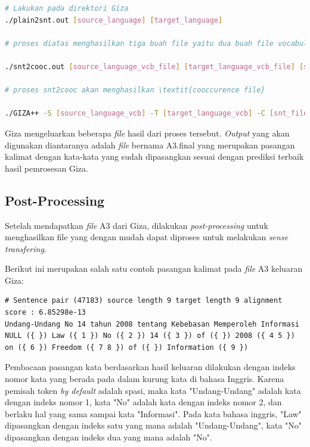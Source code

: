 \begin{lstlisting}[language=bash,caption={Word Alignment}, label={word-alignment}]
# Lakukan pada direktori Giza
./plain2snt.out [source_language] [target_language]

# proses diatas menghasilkan tiga buah file yaitu dua buah file vocabulary yang berisi indeks dengan kata (bahasa asal, dan bahasa tujuan), dan satu buah file snt yang berisi \textit{alignment} dari kalimat.

./snt2cooc.out [source_language_vcb_file] [target_language_vcb_file] [snt_file] > [coocurrence_file]

# proses snt2cooc akan menghasilkan \textit{cooccurence file}

./GIZA++ -S [source_language_vcb] -T [target_language_vcb] -C [snt_file] -CoocurrenceFile [cooc_file]
\end{lstlisting}

Giza mengeluarkan beberapa \textit{file} hasil dari proses tersebut. \textit{Output} yang akan digunakan diantaranya adalah \textit{file} bernama A3.final yang merupakan pasangan kalimat dengan kata-kata yang sudah dipasangkan sesuai dengan prediksi terbaik hasil pemrosesan Giza.

\subsection{Post-Processing}
Setelah mendapatkan \textit{file} A3 dari Giza, dilakukan \textit{post-processing} untuk menghasilkan file yang dengan mudah dapat diproses untuk melakukan \textit{sense transfering}.

Berikut ini merupakan salah satu contoh pasangan kalimat pada \textit{file} A3 keluaran Giza:

\begin{lstlisting}[caption={A3-File}, label={a3-file}]
# Sentence pair (47183) source length 9 target length 9 alignment score : 6.85298e-13
Undang-Undang No 14 tahun 2008 tentang Kebebasan Memperoleh Informasi 
NULL ({ }) Law ({ 1 }) No ({ 2 }) 14 ({ 3 }) of ({ }) 2008 ({ 4 5 }) on ({ 6 }) Freedom ({ 7 8 }) of ({ }) Information ({ 9 })
\end{lstlisting}

Pembacaan pasangan kata berdasarkan hasil keluaran dilakukan dengan indeks nomor kata yang berada pada dalam kurung kata di bahasa Inggris. Karena pemisah token \textit{by default} adalah spasi, maka kata "Undang-Undang" adalah kata dengan indeks nomor 1, kata "No" adalah kata dengan indeks nomor 2, dan berlaku hal yang sama sampai kata "Informasi". Pada kata bahasa inggris, "Law" dipasangkan dengan indeks satu yang mana adalah "Undang-Undang", kata "No" dipasangkan dengan indeks dua yang mana adalah "No". 

